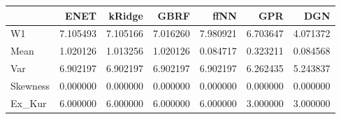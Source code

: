 \begin{tabular}{lrrrrrr}
\toprule
{} &      ENET &    kRidge &      GBRF &      ffNN &       GPR &       DGN \\
\midrule
W1       &  7.105493 &  7.105166 &  7.016260 &  7.980921 &  6.703647 &  4.071372 \\
Mean     &  1.020126 &  1.013256 &  1.020126 &  0.084717 &  0.323211 &  0.084568 \\
Var      &  6.902197 &  6.902197 &  6.902197 &  6.902197 &  6.262435 &  5.243837 \\
Skewness &  0.000000 &  0.000000 &  0.000000 &  0.000000 &  0.000000 &  0.000000 \\
Ex\_Kur   &  6.000000 &  6.000000 &  6.000000 &  6.000000 &  3.000000 &  3.000000 \\
\bottomrule
\end{tabular}
